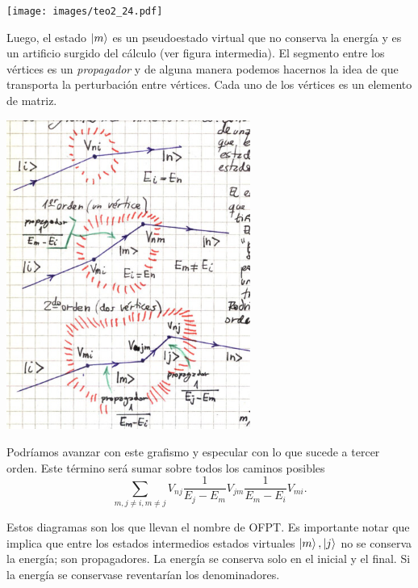 \documentclass[10pt,oneside]{CBFT_book}
\begin{document}
\texttt{[image: images/teo2\_24.pdf]}

Luego, el estado $\Ket{m}$ es un pseudoestado virtual que no conserva la energía y es un artificio surgido
del cálculo (ver figura intermedia). El segmento entre los vértices es un {\it propagador} y de alguna manera
podemos hacernos la idea de que transporta la perturbación entre vértices. Cada uno de los vértices es
un elemento de matriz.

\includegraphics[width=0.6\textwidth]{images/fig_ft2_tre_ordenes_perturbativos.jpg}

Podríamos avanzar con este grafismo y especular con lo que sucede a tercer orden. Este término será sumar
sobre todos los caminos posibles
\[
	\sum_{m,j \neq i, m \neq j} V_{nj} \frac{1}{E_j - E_m} 
	V_{jm} \frac{1}{E_m - E_i} V_{mi}.
\]

Estos diagramas son los que llevan el nombre de OFPT. Es importante notar que implica que entre los
estados intermedios estados virtuales $\Ket{m},\Ket{j}$ no se conserva la energía; son propagadores.
La energía se conserva solo en el inicial y el final. Si la energía se conservase reventarían los
denominadores.
\end{document}
